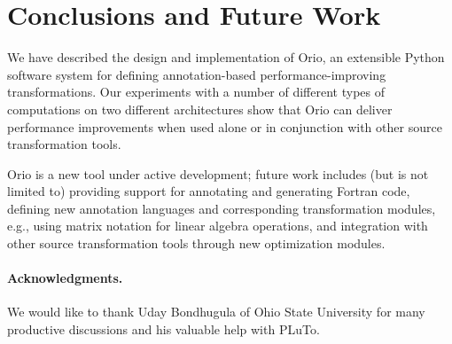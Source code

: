 \section{Conclusions and Future Work}
\label{sec:conclusions}



We have described the design and implementation of Orio, an extensible Python
software system for defining annotation-based performance-improving
transformations. Our experiments with a number of different types of
computations on two different architectures show that Orio can deliver
performance improvements when used alone or in conjunction with other source
transformation tools.

Orio is a new tool under active development; future work includes (but is not
limited to) providing support for annotating and generating Fortran code,
defining new annotation languages and corresponding transformation modules,
e.g., using matrix notation for linear algebra operations, and integration
with other source transformation tools through new optimization modules.

\vspace{-.1in} 
\paragraph{Acknowledgments.} We would like to thank
Uday Bondhugula of Ohio State University for many productive discussions and
his valuable help with PLuTo.

\vspace{-.1in} 
